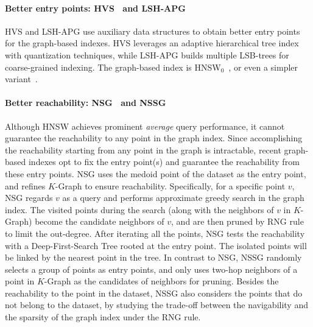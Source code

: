 \documentclass[11pt]{article}
\begin{document}
\paragraph{Better entry points: HVS~\cite{hvs} and LSH-APG~\cite{lsh-apg}}
HVS and LSH-APG use auxiliary data structures to obtain better entry points for the graph-based indexes.
HVS leverages an adaptive hierarchical tree index with quantization techniques, while LSH-APG builds multiple LSB-trees for coarse-grained indexing.
The graph-based index is HNSW$_0$~\cite{hvs}, or even a simpler variant~\cite{lsh-apg}.

\paragraph{Better reachability: NSG~\cite{nsg} and NSSG~\cite{nssg}}
Although HNSW achieves prominent \emph{average} query performance, it cannot guarantee the reachability to any point in the graph index.
Since accomplishing the reachability starting from any point in the graph is intractable, recent graph-based indexes opt to fix the entry point(s) and guarantee the reachability from these entry points.
NSG uses the medoid point of the dataset as the entry point, and refines $K$-Graph to ensure reachability.
Specifically, for a specific point $v$, NSG regards $v$ as a query and performs approximate greedy search in the graph index.
The visited points during the search (along with the neighbors of $v$ in $K$-Graph) become the candidate neighbors of $v$, and are then pruned by RNG rule to limit the out-degree.
After iterating all the points, NSG tests the reachability with a Deep-First-Search Tree rooted at the entry point.
The isolated points will be linked by the nearest point in the tree.
In contrast to NSG, NSSG randomly selects a group of points as entry points, and only uses two-hop neighbors of a point in $K$-Graph as the candidates of neighbors for pruning.
Besides the reachability to the point in the dataset, NSSG also considers the points that do not belong to the dataset, by studying the trade-off between the navigability and the sparsity of the graph index under the RNG rule.
\end{document}
